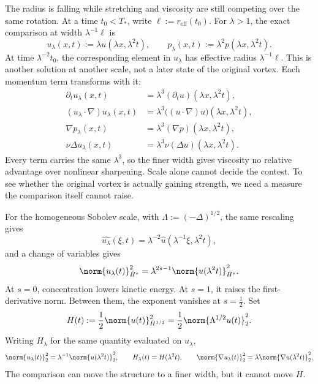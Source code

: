 
The radius is falling while stretching and viscosity are still competing over the same rotation.
At a time \(t_0<T_*\), write \(\ell:=r_{\mathrm{eff}}(t_0)\).
For \(\lambda>1\), the exact \NavierStokes{} comparison at width \(\lambda^{-1}\ell\) is
\[
  u_\lambda(x,t)
  :=
  \lambda u(\lambda x,\lambda^2t),
  \qquad
  p_\lambda(x,t)
  :=
  \lambda^2p(\lambda x,\lambda^2t).
\]
At time \(\lambda^{-2}t_0\), the corresponding element in \(u_\lambda\) has effective radius \(\lambda^{-1}\ell\).
This is another solution at another scale, not a later state of the original vortex.
Each momentum term transforms with it:
\[
\begin{aligned}
  \partial_tu_\lambda(x,t)
  &=
  \lambda^3(\partial_tu)(\lambda x,\lambda^2t),
  \\
  (u_\lambda\cdot\nabla)u_\lambda(x,t)
  &=
  \lambda^3\bigl((u\cdot\nabla)u\bigr)(\lambda x,\lambda^2t),
  \\
  \nabla p_\lambda(x,t)
  &=
  \lambda^3(\nabla p)(\lambda x,\lambda^2t),
  \\
  \nu\Delta u_\lambda(x,t)
  &=
  \lambda^3\nu(\Delta u)(\lambda x,\lambda^2t).
\end{aligned}
\]
Every term carries the same \(\lambda^3\), so the finer width gives viscosity no relative advantage over nonlinear sharpening.
Scale alone cannot decide the contest.
To see whether the original vortex is actually gaining strength, we need a measure the comparison itself cannot raise.


For the homogeneous Sobolev scale, with \(\Lambda:=(-\Delta)^{1/2}\), the same rescaling gives
\[
  \widehat{u_\lambda}(\xi,t)
  =
  \lambda^{-2}\widehat u(\lambda^{-1}\xi,\lambda^2t),
\]
and a change of variables gives
\[
  \norm{u_\lambda(t)}_{\dot H^s}^2
  =
  \lambda^{2s-1}
  \norm{u(\lambda^2t)}_{\dot H^s}^2.
\]
At \(s=0\), concentration lowers kinetic energy.
At \(s=1\), it raises the first-derivative norm.
Between them, the exponent vanishes at \(s=\tfrac12\).
Set
\[
  H(t)
  :=
  \frac12\norm{u(t)}_{\dot H^{1/2}}^2
  =
  \frac12\norm{\Lambda^{1/2}u(t)}_2^2.
\]
Writing \(H_\lambda\) for the same quantity evaluated on \(u_\lambda\),
\[
  \norm{u_\lambda(t)}_2^2
  =
  \lambda^{-1}\norm{u(\lambda^2t)}_2^2,
  \qquad
  H_\lambda(t)=H(\lambda^2t),
  \qquad
  \norm{\nabla u_\lambda(t)}_2^2
  =
  \lambda\norm{\nabla u(\lambda^2t)}_2^2.
\]
The comparison can move the structure to a finer width, but it cannot move \(H\).


